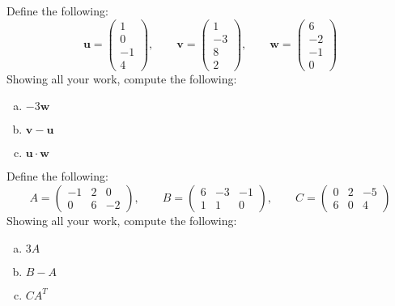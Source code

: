 \documentclass[11pt,letterpaper]{article}
\begin{document}

 Define the following:
	\[
	\mathbf{u}= \begin{pmatrix} 1 \\ 0 \\ -1 \\ 4 \end{pmatrix}, \qquad
	\mathbf{v}= \begin{pmatrix} 1 \\ -3 \\ 8 \\ 2 \end{pmatrix}, \qquad
	\mathbf{w}= \begin{pmatrix} 6 \\ -2 \\ -1 \\ 0 \end{pmatrix}
	\]
Showing all your work, compute the following:
	\begin{enumerate}[(a)]
	\item $-3\mathbf{w}$
	\item $\mathbf{v} - \mathbf{u}$
	\item $\mathbf{u} \cdot \mathbf{w}$
	\end{enumerate}



\newpage



 Define the following:
	\[
	A= \begin{pmatrix} -1 & 2 & 0 \\ 0 & 6 & -2 \end{pmatrix}, \qquad
	B= \begin{pmatrix} 6 & -3 & -1 \\ 1 & 1 & 0 \end{pmatrix}, \qquad
	C= \begin{pmatrix} 0 & 2 & -5 \\ 6 & 0 & 4 \end{pmatrix}
	\]
Showing all your work, compute the following:
	\begin{enumerate}[(a)]
	\item $3A$
	\item $B - A$
	\item $CA^T$
	\end{enumerate}
\end{document}
